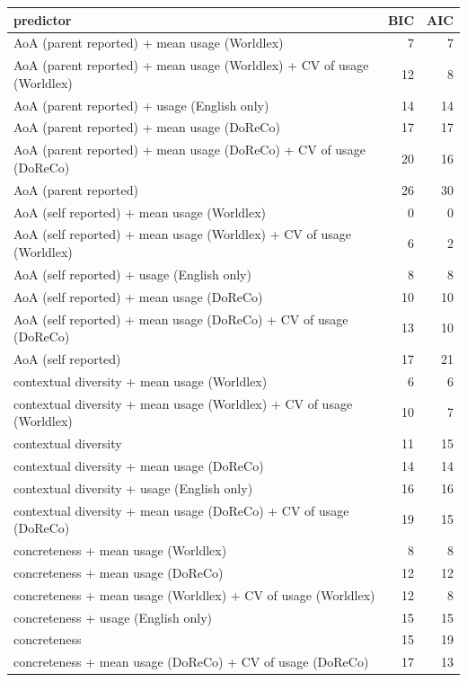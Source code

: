 \begin{table}[ht]
\centering
\begin{tabular}{lrr}
  \hline
predictor & BIC & AIC \\ 
  \hline
AoA (parent reported) + mean usage (Worldlex) & 7 & 7 \\ 
  AoA (parent reported) + mean usage (Worldlex) + CV of usage (Worldlex) & 12 & 8 \\ 
  AoA (parent reported) + usage (English only) & 14 & 14 \\ 
  AoA (parent reported) + mean usage (DoReCo) & 17 & 17 \\ 
  AoA (parent reported) + mean usage (DoReCo) + CV of usage (DoReCo) & 20 & 16 \\ 
  AoA (parent reported) & 26 & 30 \\ 
  AoA (self reported) + mean usage (Worldlex) & 0 & 0 \\ 
  AoA (self reported) + mean usage (Worldlex) + CV of usage (Worldlex) & 6 & 2 \\ 
  AoA (self reported) + usage (English only) & 8 & 8 \\ 
  AoA (self reported) + mean usage (DoReCo) & 10 & 10 \\ 
  AoA (self reported) + mean usage (DoReCo) + CV of usage (DoReCo) & 13 & 10 \\ 
  AoA (self reported) & 17 & 21 \\ 
  contextual diversity + mean usage (Worldlex) & 6 & 6 \\ 
  contextual diversity + mean usage (Worldlex) + CV of usage (Worldlex) & 10 & 7 \\ 
  contextual diversity & 11 & 15 \\ 
  contextual diversity + mean usage (DoReCo) & 14 & 14 \\ 
  contextual diversity + usage (English only) & 16 & 16 \\ 
  contextual diversity + mean usage (DoReCo) + CV of usage (DoReCo) & 19 & 15 \\ 
  concreteness + mean usage (Worldlex) & 8 & 8 \\ 
  concreteness + mean usage (DoReCo) & 12 & 12 \\ 
  concreteness + mean usage (Worldlex) + CV of usage (Worldlex) & 12 & 8 \\ 
  concreteness + usage (English only) & 15 & 15 \\ 
  concreteness & 15 & 19 \\ 
  concreteness + mean usage (DoReCo) + CV of usage (DoReCo) & 17 & 13 \\ 

\end{tabular}
\end{table}
